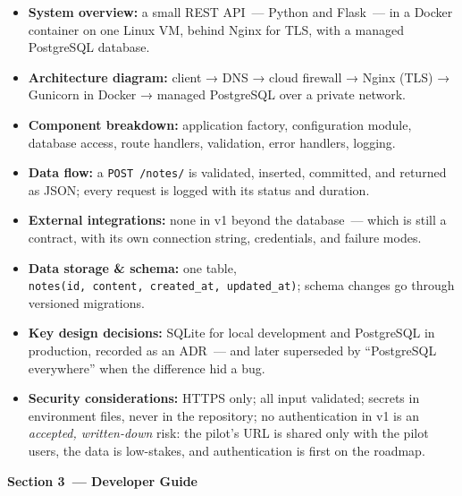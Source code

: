 \begin{itemize}
\tightlist
\item
  \textbf{System overview:} a small REST API~--- Python and Flask~--- in a Docker container on one Linux VM, behind Nginx for TLS, with a managed PostgreSQL database.
\item
  \textbf{Architecture diagram:} client → DNS → cloud firewall → Nginx (TLS) → Gunicorn in Docker → managed PostgreSQL over a private network.
\item
  \textbf{Component breakdown:} application factory, configuration module, database access, route handlers, validation, error handlers, logging.
\item
  \textbf{Data flow:} a \texttt{POST\ /notes/} is validated, inserted, committed, and returned as JSON; every request is logged with its status and duration.
\item
  \textbf{External integrations:} none in v1 beyond the database~--- which is still a contract, with its own connection string, credentials, and failure modes.
\item
  \textbf{Data storage \& schema:} one table, \texttt{notes(id,}\allowbreak{}\texttt{\ content,}\allowbreak{}\texttt{\ created\_}\allowbreak{}\texttt{at,}\allowbreak{}\texttt{\ updated\_}\allowbreak{}\texttt{at)}; schema changes go through versioned migrations.
\item
  \textbf{Key design decisions:} SQLite for local development and PostgreSQL in production, recorded as an ADR~--- and later superseded by ``PostgreSQL everywhere'' when the difference hid a bug.
\item
  \textbf{Security considerations:} HTTPS only; all input validated; secrets in environment files, never in the repository; no authentication in v1 is an \emph{accepted, written-down} risk: the pilot's URL is shared only with the pilot users, the data is low-stakes, and authentication is first on the roadmap.
\end{itemize}

\noindent{}\textbf{Section 3~--- Developer Guide}

